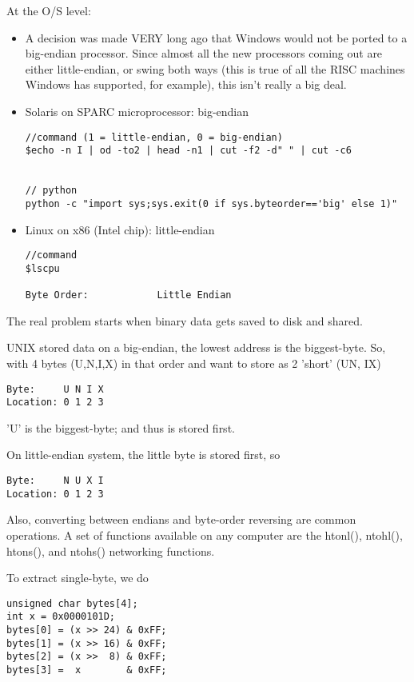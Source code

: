 At the O/S level:
\begin{itemize}

  \item  A decision was made VERY long ago that Windows would not be
ported to a big-endian processor. Since almost all the new processors coming out
are either little-endian, or swing both ways (this is true of all the RISC
machines Windows has supported, for example), this isn't really a big deal.

  \item Solaris on SPARC microprocessor: big-endian
\begin{verbatim}
//command (1 = little-endian, 0 = big-endian)
$echo -n I | od -to2 | head -n1 | cut -f2 -d" " | cut -c6 


// python
python -c "import sys;sys.exit(0 if sys.byteorder=='big' else 1)"
\end{verbatim}

  \item Linux on x86 (Intel chip): little-endian
\begin{verbatim}
//command
$lscpu

Byte Order:            Little Endian
\end{verbatim}
\end{itemize}

The real problem starts when binary data gets saved to disk and shared.

UNIX stored data on a big-endian, the lowest address is the biggest-byte. So,
with 4 bytes (U,N,I,X) in that order and want to store as 2 'short' (UN, IX)
\begin{verbatim}
Byte:     U N I X
Location: 0 1 2 3
\end{verbatim}
'U' is the biggest-byte; and thus is stored first.

On little-endian system, the little byte is stored first, so 
\begin{verbatim}
Byte:     N U X I
Location: 0 1 2 3
\end{verbatim}

Also, converting between endians and byte-order reversing are common operations.
A set of functions available on any computer are the htonl(), ntohl(), htons(),
and ntohs() networking functions.  

To extract single-byte, we do
\begin{lstlisting}
unsigned char bytes[4];
int x = 0x0000101D;
bytes[0] = (x >> 24) & 0xFF;
bytes[1] = (x >> 16) & 0xFF;
bytes[2] = (x >>  8) & 0xFF;
bytes[3] =  x        & 0xFF;
\end{lstlisting}


